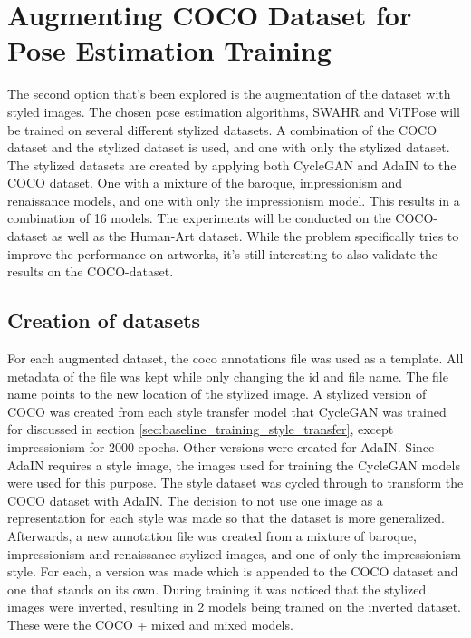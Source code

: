 \section{Augmenting COCO Dataset for Pose Estimation Training}
\label{chap:improvements_augmentation}
The second option that's been explored is the augmentation of the dataset with styled images.
The chosen pose estimation algorithms, SWAHR and ViTPose will be trained on several different stylized datasets.
A combination of the COCO dataset and the stylized dataset is used, and one with only the stylized dataset.
The stylized datasets are created by applying both CycleGAN and AdaIN to the COCO dataset.
One with a mixture of the baroque, impressionism and renaissance models, and one with only the impressionism model.
This results in a combination of 16 models.
The experiments will be conducted on the COCO-dataset as well as the Human-Art dataset.
While the problem specifically tries to improve the performance on artworks, it's still interesting to also validate the results on the COCO-dataset.

\subsection{Creation of datasets}
\label{sec:improvements_dataset_pose_estimation}
For each augmented dataset, the coco annotations file was used as a template.
All metadata of the file was kept while only changing the id and file name.
The file name points to the new location of the stylized image.
A stylized version of COCO was created from each style transfer model that CycleGAN was trained for discussed in section \ref{sec:baseline_training_style_transfer}, except impressionism for 2000 epochs.
Other versions were created for AdaIN.
Since AdaIN requires a style image, the images used for training the CycleGAN models were used for this purpose.
The style dataset was cycled through to transform the COCO dataset with AdaIN.
The decision to not use one image as a representation for each style was made so that the dataset is more generalized.
Afterwards, a new annotation file was created from a mixture of baroque, impressionism and renaissance stylized images, and one of only the impressionism style.
For each, a version was made which is appended to the COCO dataset and one that stands on its own.
During training it was noticed that the stylized images were inverted, resulting in 2 models being trained on the inverted dataset.
These were the COCO + mixed and mixed models.


